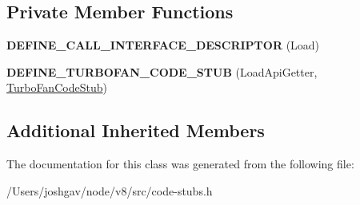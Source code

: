 \subsection*{Private Member Functions}
\begin{DoxyCompactItemize}
\item 
{\bfseries D\+E\+F\+I\+N\+E\+\_\+\+C\+A\+L\+L\+\_\+\+I\+N\+T\+E\+R\+F\+A\+C\+E\+\_\+\+D\+E\+S\+C\+R\+I\+P\+T\+OR} (Load)\hypertarget{classv8_1_1internal_1_1_load_api_getter_stub_aae4f379d5c1eb2bf353aced866564862}{}\label{classv8_1_1internal_1_1_load_api_getter_stub_aae4f379d5c1eb2bf353aced866564862}

\item 
{\bfseries D\+E\+F\+I\+N\+E\+\_\+\+T\+U\+R\+B\+O\+F\+A\+N\+\_\+\+C\+O\+D\+E\+\_\+\+S\+T\+UB} (Load\+Api\+Getter, \hyperlink{classv8_1_1internal_1_1_turbo_fan_code_stub}{Turbo\+Fan\+Code\+Stub})\hypertarget{classv8_1_1internal_1_1_load_api_getter_stub_aff33240f0fec488f6d420e99524ce26b}{}\label{classv8_1_1internal_1_1_load_api_getter_stub_aff33240f0fec488f6d420e99524ce26b}

\end{DoxyCompactItemize}
\subsection*{Additional Inherited Members}


The documentation for this class was generated from the following file\+:\begin{DoxyCompactItemize}
\item 
/\+Users/joshgav/node/v8/src/code-\/stubs.\+h\end{DoxyCompactItemize}
